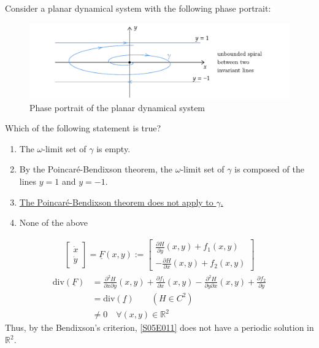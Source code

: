 \begin{solution}[5.1]
Consider a planar dynamical system with the following phase portrait:

\begin{figure}[h]
	\centering
	\includegraphics[scale=0.9]{figures/solutions/ch5/Q04D01.pdf}
	\caption{Phase portrait of the planar dynamical system}
\end{figure}

Which of the following statement is true?

\begin{enumerate}
	\item The $\omega$-limit set of $\gamma$ is empty.
	\item By the Poincaré-Bendixson theorem, the $\omega$-limit set of $\gamma$ is composed of the lines $y = 1$ and $y = -1$.
	\item \underline{The Poincaré-Bendixson theorem does not apply to $\gamma$.}
	\item None of the above
\end{enumerate}
\end{solution}

\begin{solution}[5.2]
\begin{align}
	\begin{bmatrix}\label{S05E011}
		\dot{x} \\
		\dot{y}
	\end{bmatrix} =
	\underline{F}(x,y) := \begin{bmatrix}
		\displaystyle \frac{\partial H}{\partial y}(x,y) + f_1(x,y) \\
		\displaystyle -\frac{\partial H}{\partial x}(x,y) + f_2(x,y)
	\end{bmatrix}
\end{align}
\begin{align}
	\text{div}(\underline{F}) &= \frac{\partial^2 H}{\partial x \partial y}(x,y) + \frac{\partial f_1}{\partial x}(x,y) - \frac{\partial^2 H}{\partial y \partial x}(x,y) + \frac{\partial f_2}{\partial y} \\
	&= \text{div}(\underline{f}) \qquad (H \in C^2) \\
	&\neq 0 \quad \forall (x,y)\in \mathbb{R}^2
\end{align}
Thus, by the Bendixson's criterion, \eqref{S05E011} does not have a periodic solution in $\mathbb{R}^2$.
\end{solution}


